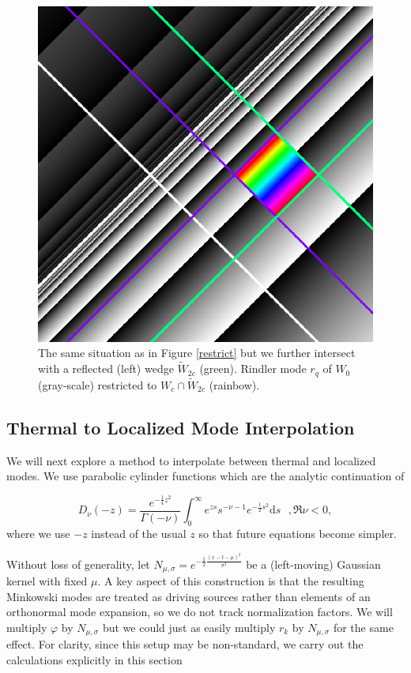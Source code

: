 \documentclass[12pt,a4paper]{article}
\newcommand{\dv}[1]{\mathrm{d} #1 \text{ }}
\begin{document}
\begin{figure}[h]
  \centering
\includegraphics[scale=0.4]{diamond_in_wedge.png}
\caption{The same situation as in Figure \ref{restrict} but we further intersect with a reflected (left) wedge $\widetilde{W}_{2c}$ (green). Rindler mode $r_q$ of $W_0$ (gray-scale) restricted to $W_c \cap \widetilde{W}_{2c}$ (rainbow).}
\label{diamond}
\end{figure}


\subsection{Thermal to Localized Mode Interpolation}
We will next explore a method to interpolate between thermal and localized modes. We use parabolic cylinder functions \cite{AbramowitzStegun1964,Olver1959UniformAE} which are the analytic continuation of 

\begin{equation}
D_\nu(-z) = \frac{e^{-\frac{1}{4}z^2}}{\Gamma\left(-\nu\right)} \int_0^\infty e^{zs} s^{-\nu - 1} e^{-\frac{1}{2} s^2} \dv{s}, \mathfrak{R}\nu < 0,
\end{equation}
where we use $-z$ instead of the usual $z$ so that future equations become simpler.


Without loss of generality, let $N_{\mu, \sigma} = e^{-\frac{1}{2} \frac{(x-t-\mu)^2}{\sigma^2}}$ be a (left-moving) Gaussian kernel with fixed $\mu$. A key aspect of this construction is that the resulting Minkowski modes are treated as driving sources rather than elements of an orthonormal mode expansion, so we do not track normalization factors. We will multiply $\varphi$ by $N_{\mu, \sigma}$ but we could just as easily multiply $r_k$ by $N_{\mu, \sigma}$ for the same effect.  For clarity, since this setup may be non-standard, we carry out the calculations explicitly in this section
\end{document}
